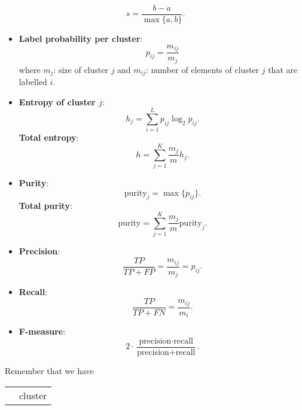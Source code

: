 \documentclass[a4paper,9pt]{extarticle}
\begin{document}
\begin{multicols*}{2}
\begin{riquadro}
\begin{itemize}
\begin{equation*}
		s=\frac{b-a}{\max\{a,b\}}.
	\end{equation*}
	\end{itemize}
\end{riquadro}
\begin{riquadro}
	\begin{itemize}
	\item 	\textbf{Label probability per cluster}:
	\begin{equation*}
		p_{ij}=\frac{m_{ij}}{m_{j}}
	\end{equation*}
	where $m_{j}$: size of cluster $j$ and $m_{ij}$: number of elements of cluster $j$ that are labelled $i$.
	\item \textbf{Entropy of cluster $j$}:
	\begin{equation*}
		h_{j}=\sum_{i=1}^{L}p_{ij}\log_{2}p_{ij}.
	\end{equation*}
\textbf{Total entropy}:
	\begin{equation*}
		h=\sum_{j=1}^{K}\frac{m_{j}}{m}h_{j}.
	\end{equation*}
	\item \textbf{Purity}:
	\begin{equation*}
		\mathrm{purity}_{j}=\max\{p_{ij}\}.
	\end{equation*}
	\textbf{Total purity}:
	\begin{equation*}
		\mathrm{purity}=\sum_{j=1}^{K}\frac{m_{j}}{m}\mathrm{purity}_{j}.
	\end{equation*}
	\item \textbf{Precision}:
	\begin{equation*}
		\frac{TP}{TP+FP}=\frac{m_{ij}}{m_{j}}=p_{ij}.
	\end{equation*}
	\item \textbf{Recall}:
	\begin{equation*}
		\frac{TP}{TP+FN}=\frac{m_{ij}}{m_{i}}.
	\end{equation*}
	\item \textbf{F-measure}:
	\begin{equation*}
		2\cdot\frac{\text{precision}\cdot\text{recall}}{\text{precision}+\text{recall}}.
	\end{equation*}
	\end{itemize}
\end{riquadro}
	Remember that we have
\begin{center}
	\begin{tabular}{|c|c|cc|}
		\cline{3-4}
		\multicolumn{2}{c}{}&\multicolumn{2}{|c|}{cluster}\\

\end{tabular}
\end{center}
\end{multicols*}
\end{document}
